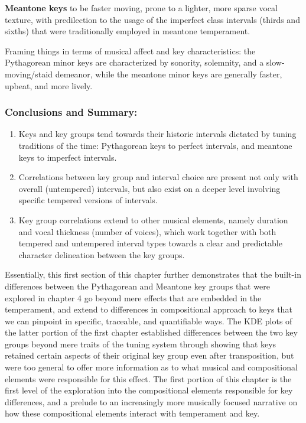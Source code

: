 \textbf{Meantone keys} to be faster moving, prone to a lighter, more
sparse vocal texture, with predilection to the usage of the imperfect
class intervals (thirds and sixths) that were traditionally employed in
meantone temperament.

Framing things in terms of musical affect and key characteristics: the
Pythagorean minor keys are characterized by sonority, solemnity, and a
slow-moving/staid demeanor, while the meantone minor keys are generally
faster, upbeat, and more lively.

\subsubsection{Conclusions and Summary:}\label{conclusions-and-summary}

\begin{enumerate}
\def\labelenumi{\arabic{enumi}.}
\tightlist
\item
  Keys and key groups tend towards their historic intervals dictated by
  tuning traditions of the time: Pythagorean keys to perfect intervals,
  and meantone keys to imperfect intervals.
\item
  Correlations between key group and interval choice are present not
  only with overall (untempered) intervals, but also exist on a deeper
  level involving specific tempered versions of intervals.
\item
  Key group correlations extend to other musical elements, namely
  duration and vocal thickness (number of voices), which work together
  with both tempered and untempered interval types towards a clear and
  predictable character delineation between the key groups.
\end{enumerate}

Essentially, this first section of this chapter further demonstrates
that the built-in differences between the Pythagorean and Meantone key
groups that were explored in chapter 4 go beyond mere effects that are
embedded in the temperament, and extend to differences in compositional
approach to keys that we can pinpoint in specific, traceable, and
quantifiable ways. The KDE plots of the latter portion of the first
chapter established differences between the two key groups beyond mere
traits of the tuning system through showing that keys retained certain
aspects of their original key group even after transposition, but were
too general to offer more information as to what musical and
compositional elements were responsible for this effect. The first
portion of this chapter is the first level of the exploration into the
compositional elements responsible for key differences, and a prelude to
an increasingly more musically focused narrative on how these
compositional elements interact with temperament and key.


